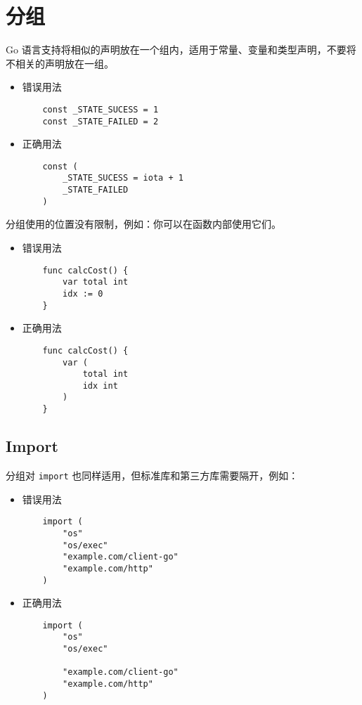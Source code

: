 \chapter{分组}
Go 语言支持将相似的声明放在一个组内，适用于常量、变量和类型声明，不要将不相关的声明放在一组。

\begin{itemize}[leftmargin=4em]
\item 错误用法

  \begin{verbatim}
    const _STATE_SUCESS = 1
    const _STATE_FAILED = 2
  \end{verbatim}
\item 正确用法

  \begin{verbatim}
    const (
    	_STATE_SUCESS = iota + 1
    	_STATE_FAILED
    )
  \end{verbatim}
\end{itemize}

分组使用的位置没有限制，例如：你可以在函数内部使用它们。
\begin{itemize}[leftmargin=4em]
\item 错误用法

  \begin{verbatim}
    func calcCost() {
    	var total int
    	idx := 0
    }
  \end{verbatim}
\item 正确用法

  \begin{verbatim}
    func calcCost() {
    	var (
    		total int
    		idx int
    	)
    }
  \end{verbatim}
\end{itemize}

\section{Import}
分组对 \texttt{import} 也同样适用，但标准库和第三方库需要隔开，例如：
\begin{itemize}[leftmargin=4em]
\item 错误用法

  \begin{verbatim}
    import (
    	"os"
    	"os/exec"
    	"example.com/client-go"
    	"example.com/http"
    )
  \end{verbatim}
\item 正确用法

  \begin{verbatim}
    import (
    	"os"
    	"os/exec"

    	"example.com/client-go"
    	"example.com/http"
    )
  \end{verbatim}
\end{itemize}

